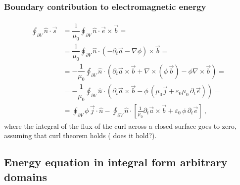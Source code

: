 \documentclass[letterpaper,10pt,english]{jupyterBook}
\begin{document}
\subsubsection*{Boundary contribution to electromagnetic energy}
\begin{equation*}
\begin{split}\begin{aligned}
\oint_{\partial V} \hat{n} \cdot \vec{s} 
& = \dfrac{1}{\mu_0} \oint_{\partial V} \hat{n} \cdot \vec{e} \times \vec{b} = \\
& = \dfrac{1}{\mu_0} \oint_{\partial V} \hat{n} \cdot \left( -\partial_t \vec{a} - \nabla \phi \right) \times \vec{b} = \\
& = - \dfrac{1}{\mu_0} \oint_{\partial V} \hat{n} \cdot \left( \partial_t \vec{a} \times \vec{b} + \nabla \times ( \phi \, \vec{b} ) - \phi \nabla \times \vec{b} \right)  = \\
& = - \dfrac{1}{\mu_0} \oint_{\partial V} \hat{n} \cdot \left( \partial_t \vec{a} \times \vec{b} - \phi \, \left( \mu_0 \vec{j} + \varepsilon_0 \mu_0 \, \partial_t \vec{e} \right) \right)  = \\
& = \oint_{\partial V}  \phi \, \vec{j} \cdot \hat{n} - \oint_{\partial V} \hat{n} \cdot \left[ \frac{1}{\mu_0} \partial_t \vec{a} \times \vec{b}+  \varepsilon_0  \, \phi\, \partial_t \vec{e} \right] \ ,
\end{aligned}\end{split}
\end{equation*}
\sphinxAtStartPar
where the integral of the flux of the curl across a closed surface goes to zero, assuming that curl theorem holds ( does it hold?).


\subsection{Energy equation in integral form \sphinxhyphen{} arbitrary domains}
\label{\detokenize{ch/energy-momentum-balance:energy-equation-in-integral-form-arbitrary-domains}}\label{\detokenize{ch/energy-momentum-balance:classical-electromagnetism-energy-momentum-energy-integral-arbitrary}}
\end{document}
